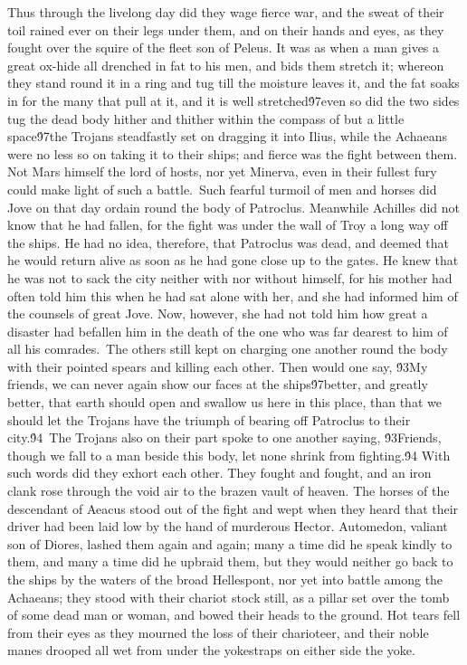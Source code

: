 {Thus through the livelong day did they wage fierce war, and the sweat of their toil rained ever on their legs under them, and on their hands and eyes, as they fought over the squire of the fleet son of Peleus. It was as when a man gives a great ox-hide all drenched in fat to his men, and bids them stretch it; whereon they stand round it in a ring and tug till the moisture leaves it, and the fat soaks in for the many that pull at it, and it is well stretched\'97even so did the two sides tug the dead body hither and thither within the compass of but a little space\'97the Trojans steadfastly set on dragging it into Ilius, while the Achaeans were no less so on taking it to their ships; and fierce was the fight between them. Not Mars himself the lord of hosts, nor yet Minerva, even in their fullest fury could make light of such a battle.\
Such fearful turmoil of men and horses did Jove on that day ordain round the body of Patroclus. Meanwhile Achilles did not know that he had fallen, for the fight was under the wall of Troy a long way off the ships. He had no idea, therefore, that Patroclus was dead, and deemed that he would return alive as soon as he had gone close up to the gates. He knew that he was not to sack the city neither with nor without himself, for his mother had often told him this when he had sat alone with her, and she had informed him of the counsels of great Jove. Now, however, she had not told him how great a disaster had befallen him in the death of the one who was far dearest to him of all his comrades.\
The others still kept on charging one another round the body with their pointed spears and killing each other. Then would one say, \'93My friends, we can never again show our faces at the ships\'97better, and greatly better, that earth should open and swallow us here in this place, than that we should let the Trojans have the triumph of bearing off Patroclus to their city.\'94\
The Trojans also on their part spoke to one another saying, \'93Friends, though we fall to a man beside this body, let none shrink from fighting.\'94 With such words did they exhort each other. They fought and fought, and an iron clank rose through the void air to the brazen vault of heaven. The horses of the descendant of Aeacus stood out of the fight and wept when they heard that their driver had been laid low by the hand of murderous Hector. Automedon, valiant son of Diores, lashed them again and again; many a time did he speak kindly to them, and many a time did he upbraid them, but they would neither go back to the ships by the waters of the broad Hellespont, nor yet into battle among the Achaeans; they stood with their chariot stock still, as a pillar set over the tomb of some dead man or woman, and bowed their heads to the ground. Hot tears fell from their eyes as they mourned the loss of their charioteer, and their noble manes drooped all wet from under the yokestraps on either side the yoke.\
}

